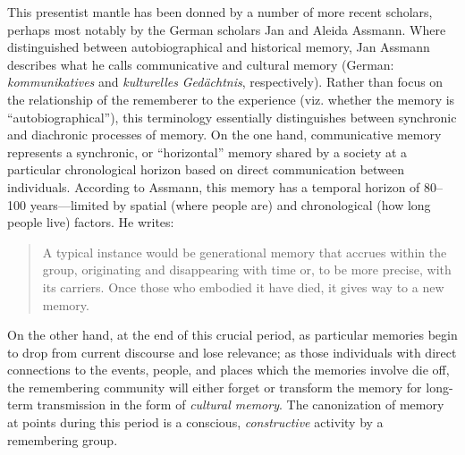 This presentist mantle has been donned by a number of more recent scholars, perhaps most notably by the German scholars Jan and Aleida Assmann.\autocites[See esp.][]{assmann_nikulin2015}{assmann2011}[and][]{a_assmann2011} Where \halbwachs distinguished between autobiographical and historical memory, Jan Assmann describes what he calls communicative and cultural memory (German: \emph{kommunikatives} and \emph{kulturelles} \emph{Gedächtnis}, respectively).\autocites[36]{assmann2011}[For a concise terminological crash-course, see][182--183]{hubenthal_carstens-hasselbalch2012} Rather than focus on the relationship of the rememberer to the experience (viz. whether the memory is ``autobiographical''), this terminology essentially distinguishes between synchronic and diachronic processes of memory. On the one hand, communicative memory represents a synchronic, or ``horizontal'' memory shared by a society at a particular chronological horizon based on direct communication between individuals. According to Assmann, this memory has a temporal horizon of 80--100 years---limited by spatial (where people are) and chronological (how long people live) factors. He writes:  

\begin{quote} A typical instance would be generational memory that accrues within the group, originating and disappearing with time or, to be more precise, with its carriers. Once those who embodied it have died, it gives way to a new memory.\autocite[36]{assmann2011} \end{quote}  

On the other hand, at the end of this crucial period, as particular memories begin to drop from current discourse and lose relevance; as those individuals with direct connections to the events, people, and places which the memories involve die off, the remembering community will either forget or transform the memory for long-term transmission in the form of \emph{cultural memory}. The canonization of memory at points during this period is a conscious, \emph{constructive} activity by a remembering group. \autocite[45]{assmann2011}  

